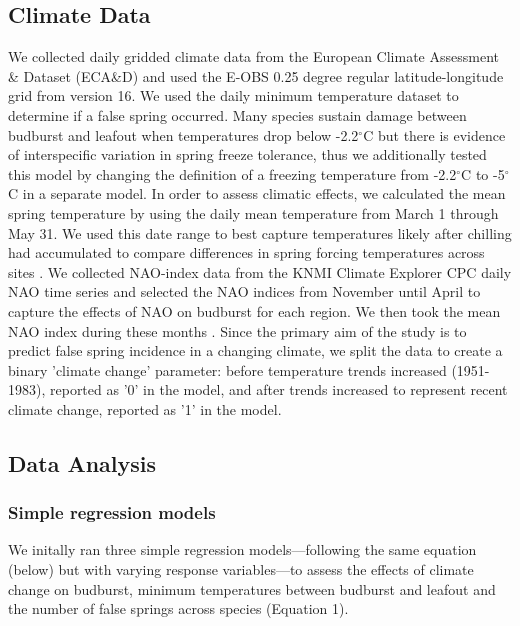 \documentclass{article}\usepackage[]{graphicx}\usepackage[]{color}
\begin{document}
\subsection*{Climate Data}
We collected daily gridded climate data from the European Climate Assessment \& Dataset (ECA\&D) and used the E-OBS 0.25 degree regular latitude-longitude grid from version 16. We used the daily minimum temperature dataset to determine if a false spring occurred. %
Many species sustain damage between budburst and leafout when temperatures drop below -2.2$^{\circ}$C but there is evidence of interspecific variation in spring freeze tolerance, thus we additionally tested this model by changing the definition of a freezing temperature from -2.2$^{\circ}$C \citep{Schwartz1993} to -5$^{\circ}$C \citep{Sakai1987,Lenz2013} in a separate model. In order to assess climatic effects, we calculated the mean spring temperature by using the daily mean temperature from March 1 through May 31. We used this date range to best capture temperatures likely after chilling had accumulated to compare differences in spring forcing temperatures across sites \citep{Basler2012, Korner2016}. We collected NAO-index data from the KNMI Climate Explorer CPC daily NAO time series and selected the NAO indices from November until April to capture the effects of NAO on budburst for each region. We then took the mean NAO index during these months \citep{NAOdata}. Since the primary aim of the study is to predict false spring incidence in a changing climate, we split the data to create a binary 'climate change' parameter: before temperature trends increased (1951-1983), reported as '0' in the model, and after trends increased \citep[1984-2016,][]{Stocker2013,Kharouba2018} to represent recent climate change, reported as '1' in the model.

\subsection*{Data Analysis} 
\subsubsection*{Simple regression models}
We initally ran three simple regression models---following the same equation (below) but with varying response variables---to assess the effects of climate change on budburst, minimum temperatures between budburst and leafout and the number of false springs across species (Equation 1).
\end{document}
